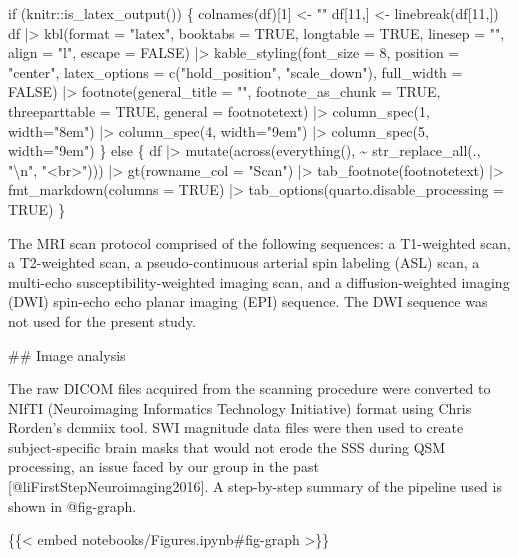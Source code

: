 \documentclass[
  letterpaper,
  DIV=11,
  numbers=noendperiod]{scrartcl}
\newenvironment{Shaded}{\begin{snugshade}}{\end{snugshade}}
\newcommand{\NormalTok}[1]{\textcolor[rgb]{0.00,0.23,0.31}{#1}}
\begin{document}
\begin{Shaded}
\begin{Highlighting}[]
\NormalTok{if (knitr::is\_latex\_output()) \{}
\NormalTok{colnames(df)[1] \textless{}{-} ""}
\NormalTok{df[11,] \textless{}{-} linebreak(df[11,])}
\NormalTok{df |\textgreater{}}
\NormalTok{  kbl(format = "latex",}
\NormalTok{    booktabs = TRUE,}
\NormalTok{    longtable = TRUE,}
\NormalTok{    linesep = "",}
\NormalTok{    align = "l",}
\NormalTok{    escape = FALSE) |\textgreater{}}
\NormalTok{    kable\_styling(font\_size = 8, position = "center", latex\_options = c("hold\_position", "scale\_down"), full\_width = FALSE) |\textgreater{}}
\NormalTok{    footnote(general\_title = "", }
\NormalTok{           footnote\_as\_chunk = TRUE,}
\NormalTok{           threeparttable = TRUE,}
\NormalTok{           general = footnotetext) |\textgreater{}}
\NormalTok{    column\_spec(1, width="8em") |\textgreater{}}
\NormalTok{    column\_spec(4, width="9em") |\textgreater{}}
\NormalTok{    column\_spec(5, width="9em")}
\NormalTok{\} else \{}
\NormalTok{df |\textgreater{} }
\NormalTok{    mutate(across(everything(), \textasciitilde{} str\_replace\_all(., "\textbackslash{}n", "\textless{}br\textgreater{}"))) |\textgreater{} }
\NormalTok{    gt(rowname\_col = "Scan") |\textgreater{} tab\_footnote(footnotetext) |\textgreater{}}
\NormalTok{    fmt\_markdown(columns = TRUE) |\textgreater{}}
\NormalTok{    tab\_options(quarto.disable\_processing = TRUE)}
\NormalTok{\}}
\NormalTok{\textasciigrave{}\textasciigrave{}\textasciigrave{}}

\NormalTok{The MRI scan protocol comprised of the following sequences: a T1{-}weighted scan, a T2{-}weighted scan, a pseudo{-}continuous arterial spin labeling (ASL) scan, a multi{-}echo susceptibility{-}weighted imaging scan, and a diffusion{-}weighted imaging (DWI) spin{-}echo echo planar imaging (EPI) sequence. The DWI sequence was not used for the present study.}

\NormalTok{\#\# Image analysis}

\NormalTok{The raw DICOM files acquired from the scanning procedure were converted to NIfTI (Neuroimaging Informatics Technology Initiative) format using Chris Rorden’s \textasciigrave{}dcmniix\textasciigrave{} tool. SWI magnitude data files were then used to create subject{-}specific brain masks that would not erode the SSS during QSM processing, an issue faced by our group in the past [@liFirstStepNeuroimaging2016]. A step{-}by{-}step summary of the pipeline used is shown in @fig{-}graph.}

\NormalTok{\{\{\textless{} embed notebooks/Figures.ipynb\#fig{-}graph \textgreater{}\}\}}


\end{Highlighting}
\end{Shaded}
\end{document}
